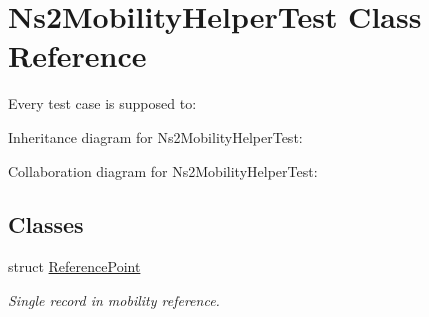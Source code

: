 \hypertarget{classNs2MobilityHelperTest}{}\section{Ns2\+Mobility\+Helper\+Test Class Reference}
\label{classNs2MobilityHelperTest}


Every test case is supposed to\+:  




Inheritance diagram for Ns2\+Mobility\+Helper\+Test\+:


Collaboration diagram for Ns2\+Mobility\+Helper\+Test\+:
\subsection*{Classes}
\begin{DoxyCompactItemize}
\item 
struct \hyperlink{structNs2MobilityHelperTest_1_1ReferencePoint}{Reference\+Point}
\begin{DoxyCompactList}\small\item\em Single record in mobility reference. \end{DoxyCompactList}\end{DoxyCompactItemize}
